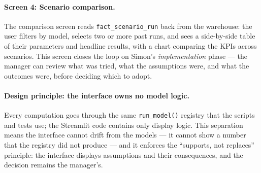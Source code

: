 \paragraph{Screen 4: Scenario comparison.}
The comparison screen reads \texttt{fact\_scenario\_run} back from the warehouse: the user filters by model, selects two or more past runs, and sees a side-by-side table of their parameters and headline results, with a chart comparing the KPIs across scenarios. This screen closes the loop on Simon's \emph{implementation} phase --- the manager can review what was tried, what the assumptions were, and what the outcomes were, before deciding which to adopt.

\paragraph{Design principle: the interface owns no model logic.}
Every computation goes through the same \texttt{run\_model()} registry that the scripts and tests use; the Streamlit code contains only display logic. This separation means the interface cannot drift from the models --- it cannot show a number that the registry did not produce --- and it enforces the ``supports, not replaces'' principle: the interface displays assumptions and their consequences, and the decision remains the manager's.

